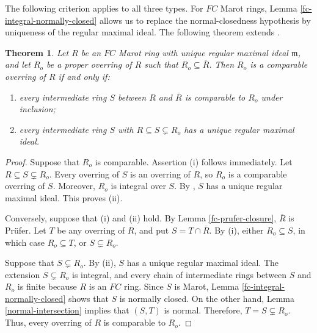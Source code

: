 \documentclass[12pt]{article}
\newtheorem{theorem}{Theorem}
\begin{document}
The following criterion applies to all three types. For $FC$ Marot rings, Lemma \ref{fc-integral-normally-closed} allows us to replace the normal-closedness hypothesis by uniqueness of the regular maximal ideal. The following theorem extends \cite[Theorem 26]{ayache}.

\begin{theorem}\label{fc-comparable-characterization}
	Let $R$ be an $FC$ Marot ring with unique regular
	maximal ideal $\mathfrak{m}$, and let $R_o$ be a
	proper overring of $R$ such that
	$R_o\subseteq\overline R$.
	Then $R_o$ is a comparable overring of $R$
	if and only if:
	\begin{enumerate}[label=(\roman*)]
		\item every intermediate ring $S$ between
		$R$ and $\overline R$ is comparable to $R_o$
		under inclusion;
		\item every intermediate ring $S$ with
		$R\subseteq S\subsetneq R_o$ has a unique
		regular maximal ideal.
	\end{enumerate}
\end{theorem}
\begin{proof}
	Suppose that $R_o$ is comparable. Assertion (i) follows immediately. Let $R\subseteq S\subsetneq R_o$. Every overring of $S$ is an overring of $R$, so $R_o$ is a comparable overring of $S$. Moreover, $R_o$ is integral over $S$. By \cite[Proposition 3.3]{marot}, $S$ has a unique regular maximal ideal. This proves (ii).
	
	Conversely, suppose that (i) and (ii) hold. By Lemma \ref{fc-prufer-closure}, $\overline R$ is Prüfer. Let $T$ be any overring of $R$, and put $S=T\cap\overline R$. By (i), either $R_o\subseteq S$, in which case $R_o\subseteq T$, or $S\subsetneq R_o$.
	
	Suppose that $S\subsetneq R_o$. By (ii), $S$ has a unique regular maximal ideal. The extension $S\subsetneq R_o$ is integral, and every chain of intermediate rings between $S$ and $R_o$ is finite because $R$ is an $FC$ ring. Since $S$ is Marot, Lemma \ref{fc-integral-normally-closed} shows that $S$ is normally closed. On the other hand, Lemma \ref{normal-intersection} implies that $(S,T)$ is normal. Therefore, $T=S\subsetneq R_o$. Thus, every overring of $R$ is comparable to $R_o$.
\end{proof}
\end{document}
